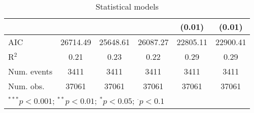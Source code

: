 \begin{table}
\begin{center}
\begin{tabular}{l@{} S[table-format=5.5]@{} S[table-format=5.7]@{} S[table-format=5.5]@{} S[table-format=5.7]@{} S[table-format=5.7]@{}}
                                     &             &              &             & (0.01)        & (0.01)       \\
\hline
AIC                                  & 26714.49    & 25648.61     & 26087.27    & 22805.11      & 22900.41     \\
R$^2$                                & 0.21        & 0.23         & 0.22        & 0.29          & 0.29         \\
Num. events                          & 3411        & 3411         & 3411        & 3411          & 3411         \\
Num. obs.                            & 37061       & 37061        & 37061       & 37061         & 37061        \\
\hline
{}
\end{tabular}
\caption{Statistical models}
\label{table:coefficients}
\end{center}
\end{table}
